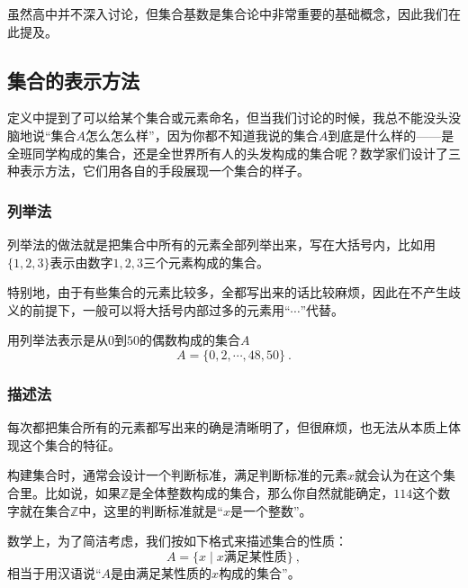 虽然高中并不深入讨论，但集合基数是集合论中非常重要的基础概念，因此我们在此提及。



\subsection{集合的表示方法}

定义中提到了可以给某个集合或元素命名，但当我们讨论的时候，我总不能没头没脑地说“集合$A$怎么怎么样”，因为你都不知道我说的集合$A$到底是什么样的——是全班同学构成的集合，还是全世界所有人的头发构成的集合呢？数学家们设计了三种表示方法，它们用各自的手段展现一个集合的样子。

\subsubsection{列举法}

列举法的做法就是把集合中所有的元素全部列举出来，写在大括号内，比如用$\{1,2,3\}$表示由数字$1,2,3$三个元素构成的集合。

特别地，由于有些集合的元素比较多，全都写出来的话比较麻烦，因此在不产生歧义的前提下，一般可以将大括号内部过多的元素用“$\cdots$”代替。

\begin{example}{用列举法表示是从$0$到$50$的偶数构成的集合$A$}
\begin{equation}
A=\{0,2, \cdots ,48,50\}~.
\end{equation}
\end{example}

\subsubsection{描述法}

每次都把集合所有的元素都写出来的确是清晰明了，但很麻烦，也无法从本质上体现这个集合的特征。

构建集合时，通常会设计一个判断标准，满足判断标准的元素$x$就会认为在这个集合里。比如说，如果$\mathbb{Z}$是全体整数构成的集合，那么你自然就能确定，$114$这个数字就在集合$\mathbb{Z}$中，这里的判断标准就是“$x$是一个整数”。

数学上，为了简洁考虑，我们按如下格式来描述集合的性质：
\begin{equation}
A = \{x\mid x\text{满足某性质}\}~, 
\end{equation}
相当于用汉语说“$A$是由满足某性质的$x$构成的集合”。





